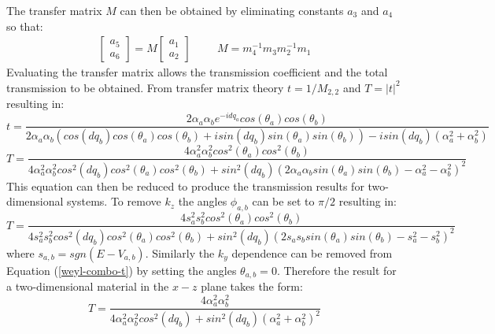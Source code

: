 \documentclass[12pt,a4paper]{article}
\begin{document}
		The transfer matrix $M$ can then be obtained by eliminating constants $a_{3}$ and $a_{4}$ so that:
		\begin{align}
			\left[\begin{array}{ccc}
				a_{5}\\
				a_{6}
			\end{array}\right]=M
			\left[\begin{array}{ccc}
				a_{1}\\
				a_{2}
			\end{array}\right]\hspace{1cm}
			M=m_{4}^{-1}m_{3}m_{2}^{-1}m_{1}
		\end{align}
		Evaluating the transfer matrix allows the transmission coefficient and the total transmission to be obtained. From transfer matrix theory $t=1/M_{2,2}$ and $T=|t|^{2}$ resulting in:
		\begin{equation}
			t=\frac{2\alpha_{a}\alpha_{b}e^{-idq_{a}}cos\left(\theta_{a}\right)cos\left(\theta_{b}\right)}{2\alpha_{a}\alpha_{b}\left(cos\left(dq_{b}\right)cos\left(\theta_{a}\right)cos\left(\theta_{b}\right)+isin\left(dq_{b}\right)sin\left(\theta_{a}\right)sin\left(\theta_{b}\right)\right)-isin\left(dq_{b}\right)\left(\alpha_{a}^{2}+\alpha_{b}^{2}\right)}
		\end{equation}
		\begin{equation}
			T=\frac{4\alpha_{a}^{2}\alpha_{b}^{2}cos^{2}\left(\theta_{a}\right)cos^{2}\left(\theta_{b}\right)}{4\alpha_{a}^{2}\alpha_{b}^{2}cos^{2}\left(dq_{b}\right)cos^{2}\left(\theta_{a}\right)cos^{2}\left(\theta_{b}\right)+sin^{2}\left(dq_{b}\right)\left(2\alpha_{a}\alpha_{b}sin\left(\theta_{a}\right)sin\left(\theta_{b}\right)-\alpha_{a}^{2}-\alpha_{b}^{2}\right)^{2}}
		\label{weyl-combo-t}
		\end{equation}
		This equation can then be reduced to produce the transmission results for two-dimensional systems. To remove $k_{z}$ the angles $\phi_{a,b}$ can be set to $\pi /2$ resulting in:
		\begin{equation}
			T=\frac{4s_{a}^{2}s_{b}^{2}cos^{2}\left(\theta_{a}\right)cos^{2}\left(\theta_{b}\right)}{4s_{a}^{2}s_{b}^{2}cos^{2}\left(dq_{b}\right)cos^{2}\left(\theta_{a}\right)cos^{2}\left(\theta_{b}\right)+sin^{2}\left(dq_{b}\right)\left(2s_{a}s_{b}sin\left(\theta_{a}\right)sin\left(\theta_{b}\right)-s_{a}^{2}-s_{b}^{2}\right)^{2}}
		\end{equation}
		where $s_{a,b}=sgn\left(E-V_{a,b}\right)$. Similarly the $k_{y}$ dependence can be removed from Equation  (\ref{weyl-combo-t}) by setting the angles $\theta_{a,b}=0$. Therefore the result for a two-dimensional material in the $x-z$ plane takes the form:
		\begin{equation}
			T=\frac{4\alpha_{a}^{2}\alpha_{b}^{2}}{4\alpha_{a}^{2}\alpha_{b}^{2}cos^{2}\left(dq_{b}\right)+sin^{2}\left(dq_{b}\right)\left(\alpha_{a}^{2}+\alpha_{b}^{2}\right)^{2}}
		\label{weyl-combo-t}
		\end{equation}
\end{document}
